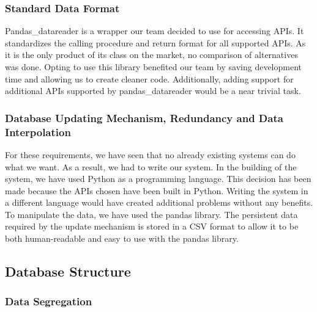 \documentclass[main.tex]{subfiles}
\begin{document}
\subsubsection*{Standard Data Format}
Pandas\_datareader \cite{pandas_datareader} is a wrapper our team decided to use for accessing APIs. It standardizes the calling procedure and return format for all supported APIs. As it is the only product of its class on the market, no comparison of alternatives was done. Opting to use this library benefited our team by saving development time and allowing us to create cleaner code. Additionally, adding support for additional APIs supported by pandas\_datareader would be a near trivial task.
\newline
    
\subsubsection*{Database Updating Mechanism, Redundancy and Data Interpolation}   
For these requirements, we have seen that no already existing systems can do what we want. As a result, we had to write our system.
In the building of the system, we have used Python as a programming language. This decision has been made because the APIs chosen have been built in Python. Writing the system in a different language would have created additional problems without any benefits. To manipulate the data, we have used the pandas library. 
The persistent data required by the update mechanism is stored in a CSV \cite{csv_iso} format to allow it to be both human-readable and easy to use with the pandas library.

\subsection{Database Structure}
\label{DB Structure}

\subsubsection{Data Segregation}
\end{document}
